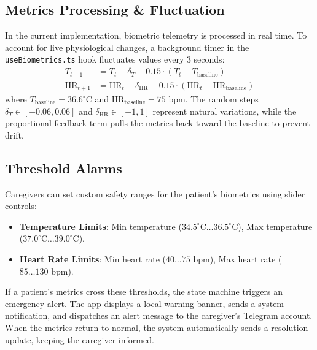 \subsection{Metrics Processing \& Fluctuation}
In the current implementation, biometric telemetry is processed in real time. To account for live physiological changes, a background timer in the \texttt{useBiometrics.ts} hook fluctuates values every 3 seconds:
\begin{align}
T_{t+1} &= T_t + \delta_T - 0.15 \cdot (T_t - T_{\text{baseline}}) \\
\text{HR}_{t+1} &= \text{HR}_t + \delta_{\text{HR}} - 0.15 \cdot (\text{HR}_t - \text{HR}_{\text{baseline}})
\end{align}
where $T_{\text{baseline}} = 36.6^{\circ}\text{C}$ and $\text{HR}_{\text{baseline}} = 75\text{ bpm}$. The random steps $\delta_T \in [-0.06, 0.06]$ and $\delta_{\text{HR}} \in [-1, 1]$ represent natural variations, while the proportional feedback term pulls the metrics back toward the baseline to prevent drift.

\subsection{Threshold Alarms}
Caregivers can set custom safety ranges for the patient's biometrics using slider controls:
\begin{itemize}
    \item \textbf{Temperature Limits}: Min temperature ($34.5^{\circ}\text{C} \dots 36.5^{\circ}\text{C}$), Max temperature ($37.0^{\circ}\text{C} \dots 39.0^{\circ}\text{C}$).
    \item \textbf{Heart Rate Limits}: Min heart rate ($40 \dots 75\text{ bpm}$), Max heart rate ($85 \dots 130\text{ bpm}$).
\end{itemize}

If a patient's metrics cross these thresholds, the state machine triggers an emergency alert. The app displays a local warning banner, sends a system notification, and dispatches an alert message to the caregiver's Telegram account. When the metrics return to normal, the system automatically sends a resolution update, keeping the caregiver informed.

